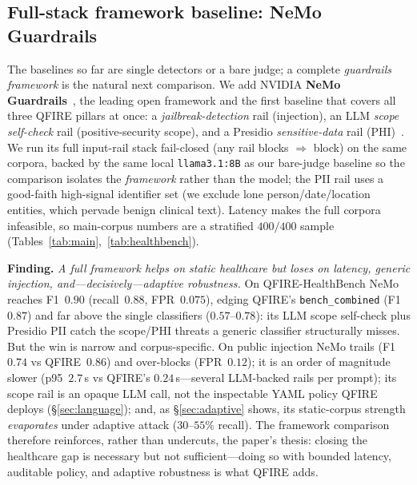 \documentclass[11pt]{article}
\begin{document}
\subsection{Full-stack framework baseline: NeMo Guardrails}\label{sec:nemo}
The baselines so far are single detectors or a bare judge; a complete
\emph{guardrails framework} is the natural next comparison. We add NVIDIA \textbf{NeMo
Guardrails}~\cite{nemoguardrails2023}, the leading open framework and the first baseline
that covers all three QFIRE pillars at once: a \emph{jailbreak-detection} rail (injection),
an LLM \emph{scope self-check} rail (positive-security scope), and a Presidio
\emph{sensitive-data} rail (PHI)~\cite{presidio}. We run its full input-rail stack fail-closed (any rail
blocks $\Rightarrow$ block) on the same corpora, backed by the same local
\texttt{llama3.1:8B} as our bare-judge baseline so the comparison isolates the
\emph{framework} rather than the model; the PII rail uses a good-faith high-signal
identifier set (we exclude lone person/date/location entities, which pervade benign
clinical text). Latency makes the full corpora infeasible, so main-corpus numbers are a
stratified $400/400$ sample (Tables~\ref{tab:main},~\ref{tab:healthbench}).

\medskip\noindent\textbf{Finding.} \emph{A full framework helps on static healthcare but loses
on latency, generic injection, and---decisively---adaptive robustness.} On
QFIRE-HealthBench NeMo reaches F1~$0.90$ (recall~$0.88$, FPR~$0.075$), edging QFIRE's
\texttt{bench\_combined} (F1~$0.87$) and far above the single classifiers
($0.57$--$0.78$): its LLM scope self-check plus Presidio PII catch the scope/PHI threats
a generic classifier structurally misses. But the win is narrow and corpus-specific. On
public injection NeMo trails (F1~$0.74$ vs QFIRE~$0.86$) and over-blocks
(FPR~$0.12$); it is an order of magnitude slower (p95~$2.7$\,s vs QFIRE's
$0.24$\,s---several LLM-backed rails per prompt); its scope rail is an opaque LLM call,
not the inspectable YAML policy QFIRE deploys (\S\ref{sec:language}); and, as
\S\ref{sec:adaptive} shows, its static-corpus strength \emph{evaporates} under adaptive
attack ($30$--$55\%$ recall). The framework comparison therefore reinforces, rather than
undercuts, the paper's thesis: closing the healthcare gap is necessary but not
sufficient---doing so with bounded latency, auditable policy, and adaptive robustness is
what QFIRE adds.
\end{document}

